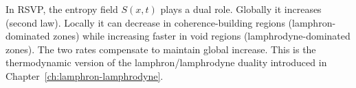 \begin{AdmPreview}
  In RSVP, the entropy field $S(x,t)$ plays a dual role.
  Globally it increases (second law).
  Locally it can decrease in coherence-building regions
  (lamphron-dominated zones) while increasing faster in
  void regions (lamphrodyne-dominated zones).
  The two rates compensate to maintain global increase.
  This is the thermodynamic version of the lamphron/lamphrodyne
  duality introduced in Chapter~\ref{ch:lamphron-lamphrodyne}.
\end{AdmPreview}

